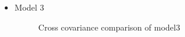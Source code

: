 \begin{itemize}
\item Model 3
\begin{figure}[H]
\begin{center}
\caption{Cross covariance comparison of model3}
\end{center}
\end{figure}

\end{itemize}


%